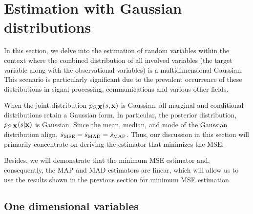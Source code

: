 \section{Estimation with Gaussian distributions}

In this section, we delve into the estimation of random variables within the context where the combined distribution of all involved variables (the target variable along with the observational variables) is a multidimensional Gaussian. This scenario is particularly significant due to the prevalent occurrence of these distributions in signal processing, communications and various other fields. 

When the joint distribution $p_{S,{\bf X}} (s, {\bf x})$ is Gaussian, all marginal and conditional distributions retain a Gaussian form. In particular, the posterior distribution, $p_{S|{\bf X}} (s|{\bf x})$ is Gaussian. Since the mean, median, and mode of the Gaussian distribution align, $\hat{s}_\text{MSE} = \hat{s}_\text{MAD} = \hat{s}_\text{MAP}$. Thus, our discussion in this section will primarily concentrate on deriving the estimator that minimizes the MSE.

Besides, we will demonstrate that the minimum MSE estimator and, consequently, the MAP and MAD estimators are linear, which will allow us to use the results shown in the previous section for minimum MSE estimation.


\subsection{One dimensional variables}

